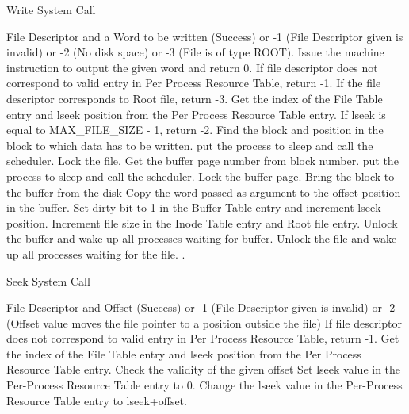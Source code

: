 
\begin{algorithm}
\caption{Write System Call}
\begin{algorithmic}
\REQUIRE File Descriptor and a Word to be written
 (Success) or -1 (File Descriptor given is invalid) or -2 (No disk space) or -3 (File is of type ROOT).
    \STATE Issue the machine instruction to output the given word and return 0.
\ENDIF
\STATE If file descriptor does not correspond to valid entry in Per Process Resource Table, return -1.
\STATE If the file descriptor corresponds to Root file, return -3.
\STATE Get the index of the File Table entry and lseek position from the Per Process Resource Table entry.
\STATE If lseek is equal to MAX\_FILE\_SIZE - 1, return -2.  
\STATE Find the block and position in the block to which data has to be written.
    \STATE put the process to sleep and call the scheduler.
\ENDWHILE
\STATE Lock the file.
\STATE Get the buffer page number from block number.
    \STATE put the process to sleep and call the scheduler.
\ENDWHILE 
\STATE Lock the buffer page.
    \STATE Bring the block to the buffer from the disk
\ENDIF
\STATE Copy the word passed as argument to the offset position in the buffer.  
\STATE Set dirty bit to 1 in the Buffer Table entry and increment lseek position.
\STATE Increment file size in the Inode Table entry and Root file entry.
\STATE Unlock the buffer and wake up all processes waiting for buffer.
\STATE Unlock the file and wake up all processes waiting for the file.
.   
\end{algorithmic}
\end{algorithm}


\begin{algorithm}
\caption{Seek System Call}
\begin{algorithmic}
\REQUIRE File Descriptor and Offset
 (Success) or -1 (File Descriptor given is invalid) or -2 (Offset value moves the file pointer to a position outside the file)
\STATE If file descriptor does not correspond to valid entry in Per Process Resource Table, return -1.
\STATE Get the index of the File Table entry and lseek position from the Per Process Resource Table entry.
\STATE Check the validity of the given offset
    \STATE Set lseek value in the Per-Process Resource Table entry to 0.
\ELSE
    \STATE Change the lseek value in the Per-Process Resource Table entry to lseek+offset.
\ENDIF
{}
\end{algorithmic}
\end{algorithm}

